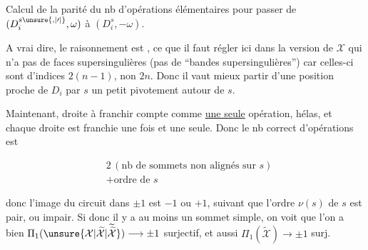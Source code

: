 Calcul de la parité du nb d'opérations élémentaires pour passer de $(D_i^{s\unsure{,|\prime|{}}},\omega)$ à $(D_i^{s},-\omega)$.





A vrai dire, le raisonnement est ,  ce que il faut régler ici dans la version de $\mathcal X$ qui n'a pas de faces supersingulières (pas de ``bandes supersingulières'') car celles-ci sont d'indices $2(n-1)$, non $2n$. Donc il vaut mieux partir d'une position proche de $D_i$  par $s$  un petit pivotement autour de $s$.

Maintenant,  droite à franchir compte comme \uline{une seule} opération, hélas, et chaque droite   est franchie une fois et une seule. Donc le nb correct d'opérations est

\[ \begin{aligned}
&2\,(\text{nb de sommets non alignés sur }s)\\
&+\text{ordre de }s
\end{aligned} \]

donc l'image du circuit dans $\pm1$ est $-1$ ou $+1$, suivant que l'ordre  $\nu(s)$ de $s$ est pair, ou impair. Si donc il y a au moins un sommet simple, on voit que l'on a bien $\Pi_1(\unsure{\mathcal X|\widetilde{\mathcal X}|\widetilde{\widetilde{\mathcal X}}})\longrightarrow\pm1$ surjectif, et aussi $\Pi_1(\widetilde{\mathcal X})\longrightarrow\pm1$ surj.

